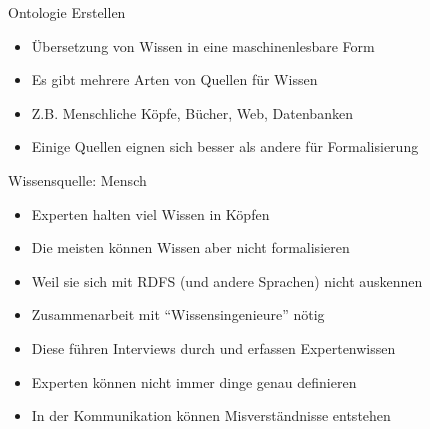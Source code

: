 \documentclass{beamer}
\begin{document}
\begin{frame}{Ontologie Erstellen}
	
	\begin{itemize}
		\item Übersetzung von Wissen in eine maschinenlesbare Form
		\item Es gibt mehrere Arten von Quellen für Wissen
		\item Z.B. Menschliche Köpfe, Bücher, Web, Datenbanken
		\item Einige Quellen eignen sich besser als andere für Formalisierung
	\end{itemize}
	
\end{frame}

\begin{frame}{Wissensquelle: Mensch}
	
	\begin{itemize}
		\item Experten halten viel Wissen in Köpfen
		\item Die meisten können Wissen aber nicht formalisieren
		\item Weil sie sich mit RDFS (und andere Sprachen) nicht auskennen
		\item Zusammenarbeit mit ``Wissensingenieure'' nötig
		\item Diese führen Interviews durch und erfassen Expertenwissen
		\item Experten können nicht immer dinge genau definieren
		\item In der Kommunikation können Misverständnisse entstehen
	\end{itemize}
	
\end{frame}
\end{document}
